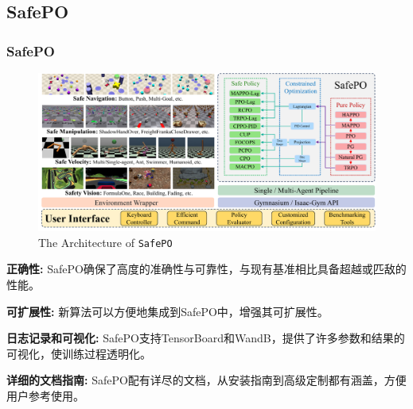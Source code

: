 \documentclass[10pt,mathserif]{beamer}%
\begin{document}
\subsection{SafePO}
\begin{frame}[t,fragile]

    \frametitle{SafePO}
\begin{figure}[ht]
  \centering
  \includegraphics[width=0.8\linewidth]{Safety-Gymnasium/assets/main-paper/arch.pdf}
  \vspace*{-0.5\baselineskip}
  \caption{The Architecture of \texttt{SafePO}}
  \label{pic:architecture}
\end{figure}
\vspace{-0.5cm}
\begin{itemize}
{
\fontsize{8pt}{9.6pt}\selectfont
    \item \textbf{正确性:} SafePO确保了高度的准确性与可靠性，与现有基准相比具备超越或匹敌的性能。
    \item \textbf{可扩展性:} 新算法可以方便地集成到SafePO中，增强其可扩展性。
    \item \textbf{日志记录和可视化:} SafePO支持TensorBoard和WandB，提供了许多参数和结果的可视化，使训练过程透明化。
    \item \textbf{详细的文档指南:} SafePO配有详尽的文档，从安装指南到高级定制都有涵盖，方便用户参考使用。
}
\end{itemize}

\end{frame}
\end{document}

